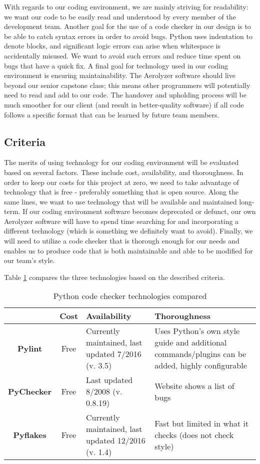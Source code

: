 \documentclass[onecolumn, draftclsnofoot,10pt, compsoc]{IEEEtran}
\begin{document}
\begin{flushleft}
With regards to our coding environment, we are mainly striving for readability: we want our code to be easily read and understood by every member of the development team. 
Another goal for the use of a code checker in our design is to be able to catch syntax errors in order to avoid bugs. 
Python uses indentation to denote blocks, and significant logic errors can arise when whitespace is accidentally misused. 
We want to avoid such errors and reduce time spent on bugs that have a quick fix. 
A final goal for technology used in our coding environment is ensuring maintainability. The Aerolyzer software should live beyond our senior capstone class; this means other programmers will potentially need to read and add to our code. The handover and upholding process will be much smoother for our client (and result in better-quality software) if all code follows a specific format that can be learned by future team members.



\subsection{Criteria}
The merits of using technology for our coding environment will be evaluated based on several factors. These include cost, availability, and thoroughness. In order to keep our costs for this project at zero, we need to take advantage of technology that is free - preferably something that is open source. Along the same lines, we want to use technology that will be available and maintained long-term. If our coding environment software becomes deprecated or defunct, our own Aerolyzer software will have to spend time searching for and incorporating a different technology (which is something we definitely want to avoid). Finally, we will need to utilize a code checker that is thorough enough for our needs and enables us to produce code that is both maintainable and able to be modified for our team's style.

Table \ref{table:5} compares the three technologies based on the described criteria. \cite{26}\cite{27}\cite{28}
\begin{table}[h!]
\caption{Python code checker technologies compared}\label{table:5}
\centering
	\begin{tabular}{| c | c |  p{6cm}  | p{6cm} |} 
		\hline
		 & Cost & Availability & Thoroughness \\ [0.5ex] 
		\hline
		\textbf{Pylint} & Free & Currently maintained, last updated 7/2016 (v. 3.5) & Uses Python's own style guide and additional commands/plugins can be added, highly configurable\\ 
		\hline
		\textbf{PyChecker} & Free & Last updated 8/2008 (v. 0.8.19) & Website shows a list of bugs\\
		\hline
		\textbf{Pyflakes} & Free & Currently maintained, last updated 12/2016 (v. 1.4) & Fast but limited in what it checks (does not check style)  \\
		\hline
	\end{tabular}
\end{table}


\end{flushleft}
\end{document}
